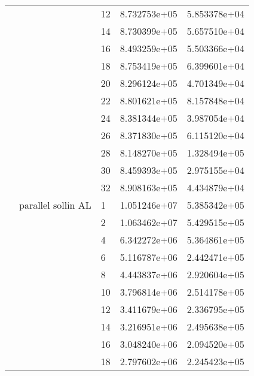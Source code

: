 \begin{tabular}{lllrr}
                      &                     & 12 &  8.732753e+05 &  5.853378e+04 \\
                      &                     & 14 &  8.730399e+05 &  5.657510e+04 \\
                      &                     & 16 &  8.493259e+05 &  5.503366e+04 \\
                      &                     & 18 &  8.753419e+05 &  6.399601e+04 \\
                      &                     & 20 &  8.296124e+05 &  4.701349e+04 \\
                      &                     & 22 &  8.801621e+05 &  8.157848e+04 \\
                      &                     & 24 &  8.381344e+05 &  3.987054e+04 \\
                      &                     & 26 &  8.371830e+05 &  6.115120e+04 \\
                      &                     & 28 &  8.148270e+05 &  1.328494e+05 \\
                      &                     & 30 &  8.459393e+05 &  2.975155e+04 \\
                      &                     & 32 &  8.908163e+05 &  4.434879e+04 \\
                      & parallel sollin AL & 1  &  1.051246e+07 &  5.385342e+05 \\
                      &                     & 2  &  1.063462e+07 &  5.429515e+05 \\
                      &                     & 4  &  6.342272e+06 &  5.364861e+05 \\
                      &                     & 6  &  5.116787e+06 &  2.442471e+05 \\
                      &                     & 8  &  4.443837e+06 &  2.920604e+05 \\
                      &                     & 10 &  3.796814e+06 &  2.514178e+05 \\
                      &                     & 12 &  3.411679e+06 &  2.336795e+05 \\
                      &                     & 14 &  3.216951e+06 &  2.495638e+05 \\
                      &                     & 16 &  3.048240e+06 &  2.094520e+05 \\
                      &                     & 18 &  2.797602e+06 &  2.245423e+05 \\

\end{tabular}
